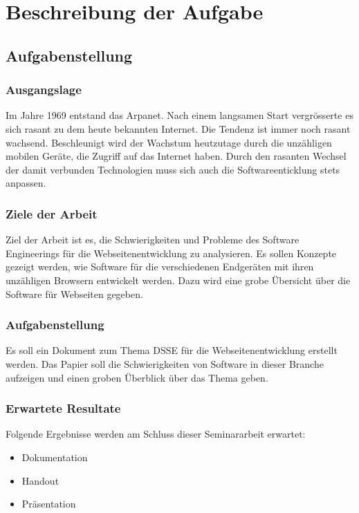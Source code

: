 \chapter{Beschreibung der Aufgabe}

\section{Aufgabenstellung}

\subsection{Ausgangslage}
Im Jahre 1969 entstand das Arpanet. Nach einem langsamen Start vergrösserte es sich rasant zu dem heute bekannten Internet. Die Tendenz ist immer noch rasant wachsend. Beschleunigt wird der Wachstum heutzutage durch die unzähligen mobilen Geräte, die Zugriff auf das Internet haben. Durch den rasanten Wechsel der damit verbunden Technologien muss sich auch die Softwareenticklung stets anpassen.

\subsection{Ziele der Arbeit}
Ziel der Arbeit ist es, die Schwierigkeiten und Probleme des Software Engineerings für die Webseitenentwicklung zu analysieren. Es sollen Konzepte gezeigt werden, wie Software für die verschiedenen Endgeräten mit ihren unzähligen Browsern entwickelt werden. Dazu wird eine grobe Übersicht über die Software für Webseiten gegeben.

\subsection{Aufgabenstellung}
Es soll ein Dokument zum Thema DSSE für die Webseitenentwicklung erstellt werden. Das Papier soll die Schwierigkeiten von Software in dieser Branche aufzeigen und einen groben Überblick über das Thema geben.

\subsection{Erwartete Resultate}
Folgende Ergebnisse werden am Schluss dieser Seminararbeit erwartet:
\begin{itemize}
\item Dokumentation
\item Handout
\item Präsentation
\end{itemize}